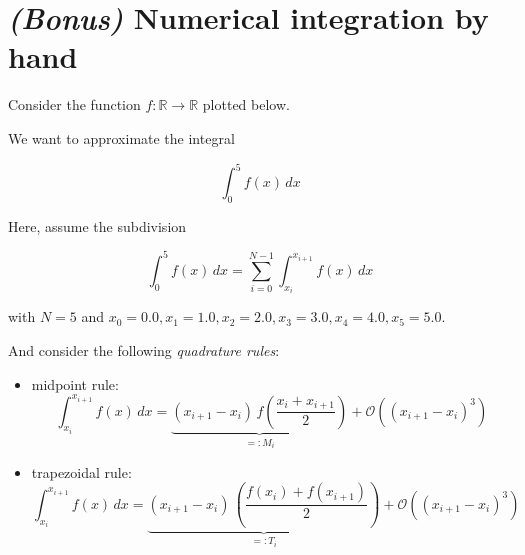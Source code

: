 \documentclass[12pt,addpoints]{exam}
\begin{document}
\begin{questions}
\begin{parts}
\end{parts}

\pagebreak

\section*{\textit{(Bonus)} Numerical integration by hand}

\bonusquestion

Consider the function $f: \mathbb{R} \to \mathbb{R}$ plotted below.



We want to approximate the integral

\begin{equation}
    \int_{0}^{5} f(x) \, dx
\end{equation}

Here, assume the subdivision

\begin{equation}
    \int_{0}^{5} f(x) \, dx = \sum_{i=0}^{N - 1} \int_{x_i}^{x_{i+1}} f(x) \, dx
\end{equation}

with $N = 5$ and $x_0 = 0.0, x_1 = 1.0, x_2 = 2.0, x_3 = 3.0, x_4 = 4.0, x_5 = 5.0$.

And consider the following \textit{quadrature rules}:

\begin{itemize}
    \item midpoint rule:
    \begin{equation}
        \int_{x_i}^{x_{i+1}} f(x) \, dx = \underbrace{(x_{i+1} - x_i) \, f\left( \frac{x_{i} + x_{i+1}}{2} \right)}_{=:M_i} + \mathcal{O}((x_{i+1} - x_i)^3)
    \end{equation}
    \item trapezoidal rule:
    \begin{equation}
        \int_{x_i}^{x_{i+1}} f(x) \, dx = \underbrace{(x_{i+1} - x_i) \, \left(\frac{f(x_i) + f(x_{i+1})}{2}\right)}_{=:T_i} + \mathcal{O}((x_{i+1} - x_i)^3)
    \end{equation}
\end{itemize}


\end{questions}
\end{document}
